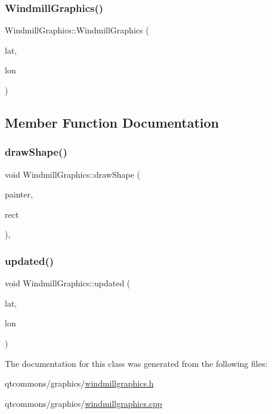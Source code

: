 \subsubsection{\texorpdfstring{WindmillGraphics()}{WindmillGraphics()}}
{\footnotesize\ttfamily Windmill\+Graphics\+::\+Windmill\+Graphics (\begin{DoxyParamCaption}\item[{float}]{lat,  }\item[{float}]{lon }\end{DoxyParamCaption})}



\subsection{Member Function Documentation}
\mbox{\label{class_windmill_graphics_a84b23ff6fa00a8626701a47842feb799}} 
\subsubsection{\texorpdfstring{drawShape()}{drawShape()}}
{\footnotesize\ttfamily void Windmill\+Graphics\+::draw\+Shape (\begin{DoxyParamCaption}\item[{Q\+Painter \&}]{painter,  }\item[{const qmapcontrol\+::\+Rect\+World\+Px \&}]{rect }\end{DoxyParamCaption})\hspace{0.3cm}{\ttfamily [protected]}, {\ttfamily [virtual]}}

\mbox{\label{class_windmill_graphics_a149e8630bea678bdc0d750ab8b80246d}} 
\subsubsection{\texorpdfstring{updated()}{updated()}}
{\footnotesize\ttfamily void Windmill\+Graphics\+::updated (\begin{DoxyParamCaption}\item[{float}]{lat,  }\item[{float}]{lon }\end{DoxyParamCaption})}



The documentation for this class was generated from the following files\+:\begin{DoxyCompactItemize}
\item 
qtcommons/graphics/\mbox{\hyperlink{windmillgraphics_8h}{windmillgraphics.\+h}}\item 
qtcommons/graphics/\mbox{\hyperlink{windmillgraphics_8cpp}{windmillgraphics.\+cpp}}\end{DoxyCompactItemize}
